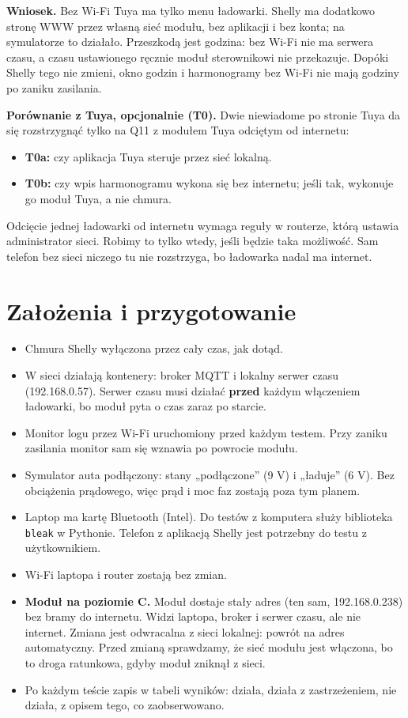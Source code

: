 \documentclass[11pt,a4paper]{article}
\begin{document}
\textbf{Wniosek.} Bez Wi-Fi Tuya ma tylko menu ładowarki. Shelly ma dodatkowo stronę WWW przez własną sieć modułu, bez aplikacji i bez konta; na symulatorze to działało. Przeszkodą jest godzina: bez Wi-Fi nie ma serwera czasu, a czasu ustawionego ręcznie moduł sterownikowi nie przekazuje. Dopóki Shelly tego nie zmieni, okno godzin i harmonogramy bez Wi-Fi nie mają godziny po zaniku zasilania.


\textbf{Porównanie z Tuya, opcjonalnie (T0).} Dwie niewiadome po stronie Tuya da się rozstrzygnąć tylko na Q11 z modułem Tuya odciętym od internetu:

\begin{itemize}
\item \textbf{T0a:} czy aplikacja Tuya steruje przez sieć lokalną.
\item \textbf{T0b:} czy wpis harmonogramu wykona się bez internetu; jeśli tak, wykonuje go moduł Tuya, a nie chmura.
\end{itemize}

Odcięcie jednej ładowarki od internetu wymaga reguły w routerze, którą ustawia administrator sieci. Robimy to tylko wtedy, jeśli będzie taka możliwość. Sam telefon bez sieci niczego tu nie rozstrzyga, bo ładowarka nadal ma internet.


\section{Założenia i przygotowanie}

\begin{itemize}
\item Chmura Shelly wyłączona przez cały czas, jak dotąd.
\item W sieci działają kontenery: broker MQTT i lokalny serwer czasu (192.168.0.57). Serwer czasu musi działać \textbf{przed} każdym włączeniem ładowarki, bo moduł pyta o czas zaraz po starcie.
\item Monitor logu przez Wi-Fi uruchomiony przed każdym testem. Przy zaniku zasilania monitor sam się wznawia po powrocie modułu.
\item Symulator auta podłączony: stany „podłączone” (9 V) i „ładuje” (6 V). Bez obciążenia prądowego, więc prąd i moc faz zostają poza tym planem.
\item Laptop ma kartę Bluetooth (Intel). Do testów z komputera służy biblioteka \texttt{bleak} w Pythonie. Telefon z aplikacją Shelly jest potrzebny do testu z użytkownikiem.
\item Wi-Fi laptopa i router zostają bez zmian.
\item \textbf{Moduł na poziomie C.} Moduł dostaje stały adres (ten sam, 192.168.0.238) bez bramy do internetu. Widzi laptopa, broker i serwer czasu, ale nie internet. Zmiana jest odwracalna z sieci lokalnej: powrót na adres automatyczny. Przed zmianą sprawdzamy, że sieć modułu jest włączona, bo to droga ratunkowa, gdyby moduł zniknął z sieci.
\item Po każdym teście zapis w tabeli wyników:  działa,  działa z zastrzeżeniem,  nie działa, z opisem tego, co zaobserwowano.
\end{itemize}
\end{document}
